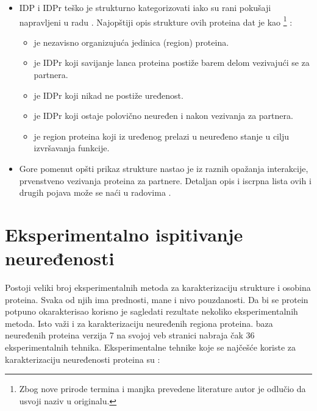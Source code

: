 \begin{itemize}
  \item 
    IDP i IDPr teško je strukturno kategorizovati \parencite{oldfield2014,
      dunker2001} iako su rani pokušaji napravljeni u radu \parencite{dunker2001}.
      Najopštiji opis strukture ovih proteina dat je kao
      \footnote{Zbog nove
        prirode termina i manjka prevedene literature autor je odlučio da
      usvoji naziv u originalu.} \parencite{uversky2016}:
    \begin{itemize}
      \item {}  je nezavisno organizujuća jedinica (region) proteina.
      \item {}  je IDPr koji savijanje lanca proteina postiže barem delom vezivajući se za partnera. 
      \item {}  je IDPr koji nikad ne postiže uređenost.
      \item {}  je IDPr koji ostaje polovično neuređen i nakon vezivanja za partnera.
      \item {}  je region proteina koji iz uređenog prelazi u neuređeno stanje u cilju izvršavanja funkcije.
    \end{itemize}

  \item 
    Gore pomenut opšti prikaz strukture nastao je iz raznih opažanja
    interakcije, prvenstveno vezivanja proteina za partnere.
    Detaljan opis i iscrpna lista ovih i drugih pojava može se naći u radovima
    \cite{uversky2016, a2z,  Tompa2009}.

\end{itemize}

\section{Eksperimentalno ispitivanje neuređenosti}

Postoji veliki broj eksperimentalnih metoda za karakterizaciju strukture i
osobina proteina.  Svaka od njih ima prednosti, mane i nivo pouzdanosti. Da bi
se protein potpuno okarakterisao korisno je sagledati rezultate nekoliko
eksperimentalnih metoda. Isto važi i za karakterizaciju neuređenih regiona
proteina. \textit{} \cite{Piovesan2016} baza neuređenih
proteina verzija 7 na svojoj veb stranici nabraja čak 36 eksperimentalnih
tehnika.  Eksperimentalne tehnike koje se najčešće koriste za karakterizaciju
neuređenosti proteina su \cite{dunker2001}: 

